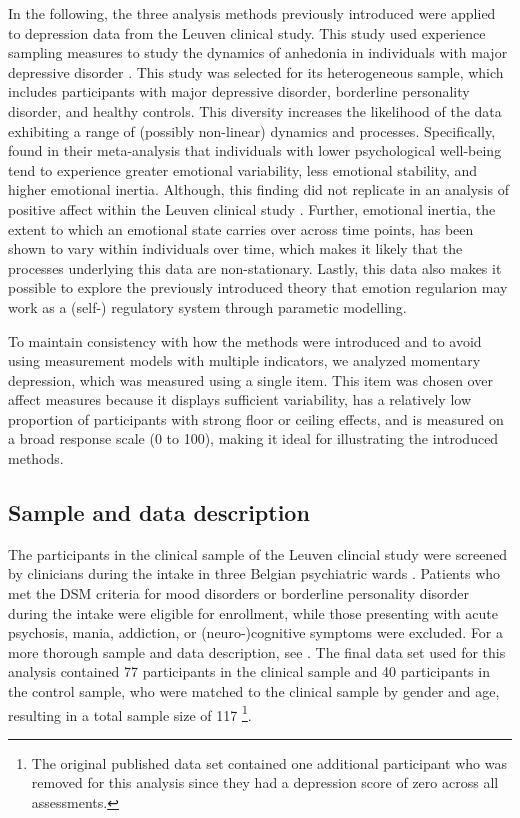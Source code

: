 \documentclass[man, floatsintext]{apa7}
\begin{document}
In the following, the three analysis methods previously introduced were
applied to depression data from the Leuven clinical study. This study used
experience sampling measures to study the dynamics of anhedonia in
individuals with major depressive disorder \parencite{heininga_dynamical_2019}.
This study was selected for its
heterogeneous sample, which includes participants with major depressive
disorder, borderline personality disorder, and healthy controls. This diversity
increases the likelihood of the data exhibiting a range of
(possibly non-linear) dynamics
and processes. Specifically, \textcite{houben_relation_2015}
found in their meta-analysis
that individuals with lower psychological well-being tend to experience greater
emotional variability, less emotional stability, and higher emotional inertia.
Although, this finding did not replicate in an analysis of positive affect
within the Leuven clinical study \parencite{heininga_dynamical_2019}.
Further, emotional
inertia, the extent to which an emotional state carries over across
time points, has been shown to vary within individuals over time, which makes
it likely that the processes underlying this data are non-stationary.
Lastly, this data also makes it possible to explore the previously
introduced theory that emotion regularion may work as a (self-) regulatory
system through parametic modelling.

To maintain consistency with how the methods were introduced and to avoid using
measurement models with multiple indicators, we analyzed momentary
depression, which was measured using a single item. This item was chosen over
affect measures because it displays sufficient variability, has a relatively
low proportion of participants with strong floor or ceiling effects, and is
measured on a broad response scale (0 to 100), making it ideal for illustrating
the introduced methods.

\subsection{Sample and data description}

The participants in the clinical sample of the Leuven clincial study were
screened by clinicians during the intake
in three Belgian psychiatric wards \parencite{heininga_dynamical_2019}.
Patients who met the DSM
criteria for mood disorders or borderline personality disorder during the
intake were eligible for enrollment, while those presenting with acute
psychosis, mania, addiction, or (neuro-)cognitive symptoms were excluded.
For a more thorough sample and data description, see
\textcite{heininga_dynamical_2019}. The final data set used for this analysis
contained 77 participants in the clinical sample and 40 participants in
the control sample, who were matched to the clinical sample by gender and age,
resulting in a total sample size of 117
\footnote{The original published data set contained one additional participant
  who was removed for this analysis since they had a depression score of
  zero across all assessments.}.
\end{document}
